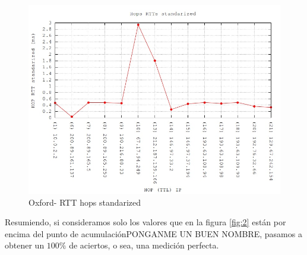 \begin{figure}[!htbp]
  \centering
    \includegraphics[scale=0.5]{imagenes/oxford-graficos/traceroute-oxford-standarized.jpg}
  \caption{Oxford- RTT hops standarized}
  \label{tiempos-oxford-estandarizados}
\end{figure}

Resumiendo, si consideramos solo los valores que en la figura \ref{fig:2} están por encima del punto de acumulaciónPONGANME UN BUEN NOMBRE, pasamos a obtener un $100\%$ de aciertos, o sea, una medición perfecta.


